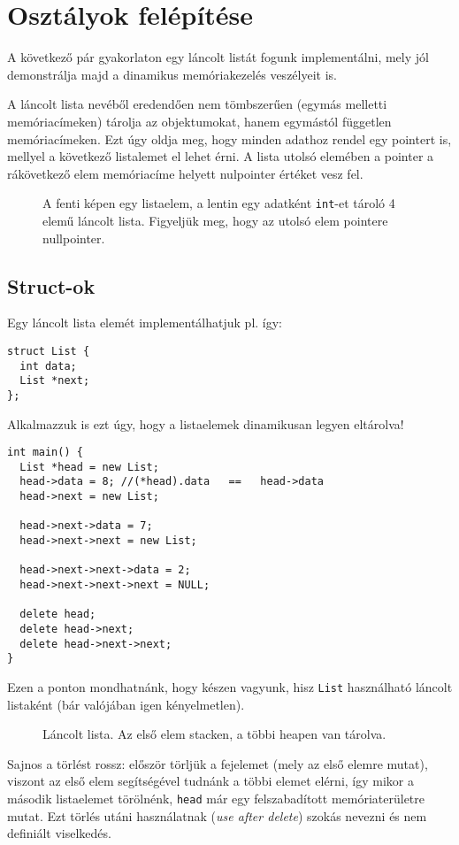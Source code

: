 \documentclass[../cpp_book/cpp_book.tex]{subfiles}
\begin{document}
	\section{Osztályok felépítése}
	A következő pár gyakorlaton egy láncolt listát fogunk implementálni, mely jól demonstrálja majd a dinamikus memóriakezelés veszélyeit is.
	
	\smallskip
	A láncolt lista nevéből eredendően nem tömbszerűen (egymás melletti memóriacímeken) tárolja az objektumokat, hanem egymástól független memóriacímeken. Ezt úgy oldja meg, hogy minden adathoz rendel egy pointert is, mellyel a következő listalemet el lehet érni. A lista utolsó elemében a pointer a rákövetkező elem memóriacíme helyett nulpointer értéket vesz fel.
	\begin{figure}[H]
		\centering
		
		\caption{A fenti képen egy listaelem, a lentin egy adatként \texttt{int}-et tároló 4 elemű láncolt lista. Figyeljük meg, hogy az utolsó elem pointere nullpointer.}\label{fig_list-example}
	\end{figure}
	\subsection{Struct-ok}
	Egy láncolt lista elemét implementálhatjuk pl. így:
	\begin{lstlisting}
struct List {
  int data;
  List *next;
};
	\end{lstlisting}
	Alkalmazzuk is ezt úgy, hogy  a listaelemek dinamikusan legyen eltárolva!
	\begin{lstlisting}
int main() {
  List *head = new List;
  head->data = 8; //(*head).data   ==   head->data
  head->next = new List;

  head->next->data = 7;
  head->next->next = new List;

  head->next->next->data = 2;
  head->next->next->next = NULL;

  delete head;
  delete head->next;
  delete head->next->next;
}
	\end{lstlisting}
	Ezen a ponton mondhatnánk, hogy készen vagyunk, hisz \texttt{List} használható láncolt listaként (bár valójában igen kényelmetlen).
	\medskip
	
	\begin{figure}[!h]
		\centering
		
		\caption{Láncolt lista. Az első elem stacken, a többi heapen van tárolva.}
	\end{figure}
	Sajnos a törlést rossz: először törljük a fejelemet (mely az első elemre mutat), viszont az első elem segítségével tudnánk a többi elemet elérni, így mikor a második listaelemet törölnénk, \texttt{head} már egy felszabadított memóriaterületre mutat. Ezt törlés utáni használatnak (\textit{use after delete}) szokás nevezni és nem definiált viselkedés.
	
\end{document}
